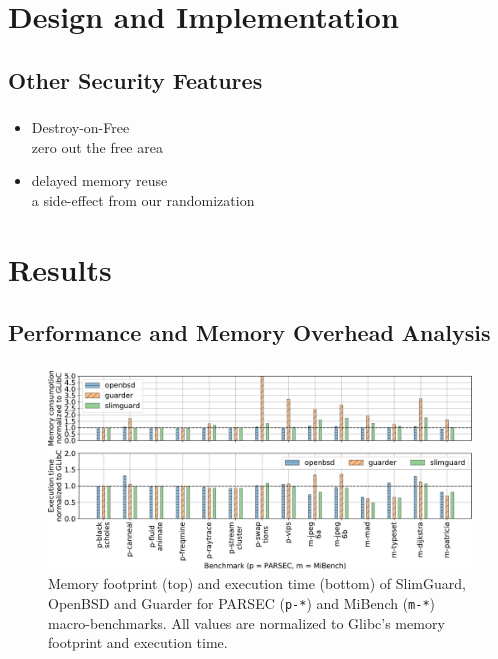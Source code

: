 \documentclass{beamer}
\begin{document}
\section{Design and Implementation}
\subsection{Other Security Features}
\begin{frame}
    \frametitle{\secname}
    \framesubtitle{\subsecname}
    \begin{itemize}
        \item Destroy-on-Free\\
            zero out the free area
        \item delayed memory reuse\\
            a side-effect from our randomization
    \end{itemize}
\end{frame}

\section{Results}
\subsection{Performance and Memory Overhead Analysis}
\begin{frame}
		\frametitle{\secname}
    \framesubtitle{\subsecname}
    \begin{figure}
      \centering
      \includegraphics[scale=0.3]{macro-mem.pdf}
      \\
      \includegraphics[scale=0.3]{macro-time.pdf}
      \\Memory footprint (top) and execution time (bottom) of SlimGuard,
      OpenBSD and Guarder for PARSEC (\texttt{p-*}) and MiBench (\texttt{m-*})
      macro-benchmarks. All values are normalized to Glibc's memory footprint
      and execution time.
    \end{figure}
\end{frame}
\end{document}
